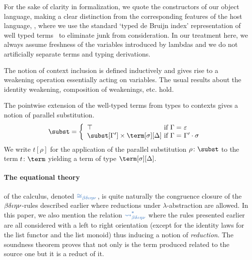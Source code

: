 For the sake of clarity in formalization, we quote the constructors of
our object language, making a clear distinction from the corresponding
features of the host language, \agda, where we use the standard `typed
de Bruijn index' representation of well typed
terms~\cite{deBruijn:dummies,DBLP:conf/csl/AltenkirchR99} to eliminate
junk from consideration.
In our treatment here, we always assume freshness of the variables
introduced by lambdas and we do not artificially separate terms and typing
derivations.

The notion of context inclusion is defined inductively and gives rise to
a weakening operation essentially acting on variables. The usual results
about the identity weakening, composition of weakenings, etc. hold.

The pointwise extension of the well-typed terms from types to contexts gives
a notion of parallel substitution.
$$\subst = \left\lbrace
\begin{array}{l@{\text{ if }\Gamma =~}l}
\top & \varepsilon \\
\subst[\Gamma'] \times \term[\sigma][\Delta] & \Gamma' \cdot \sigma
\end{array}\right.$$
We write $t [ \rho ]$ for the application of the parallel substitution $\rho \colon \subst$
to the term $t \colon \term$ yielding a term of type $\term[\sigma][\Delta]$.


\paragraph{The equational theory} of the calculus, denoted $\conv$, is quite
naturally the congruence closure of the $\operatorname{\beta\delta\iota\eta\nu}$-rules described earlier where
reductions under $\lambda$-abstraction are allowed. In this paper, we also mention
the relation $\reduces$ where the rules presented earlier are all considered with
a left to right orientation (except for the identity laws for the list functor
and the list monoid) thus inducing a notion of \emph{reduction}. The soundness
theorem proves that not only is the term produced related to the source one but
it is a reduct of it.

